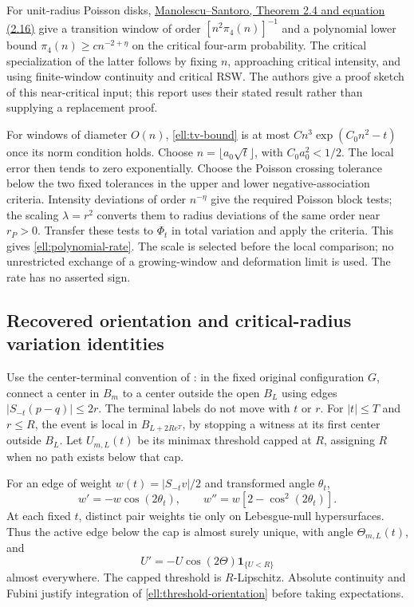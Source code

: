 \documentclass[11pt,a4paper]{article}
\theoremstyle{definition}
\theoremstyle{remark}
\numberwithin{equation}{section}
\begin{document}
For unit-radius Poisson disks,
\href{https://arxiv.org/html/2211.11661v1}{Manolescu--Santoro,
Theorem 2.4 and equation (2.16)} give a transition window of order
$[n^2\pi_4(n)]^{-1}$ and a polynomial lower bound
$\pi_4(n)\ge c n^{-2+\eta}$ on the critical four-arm probability.
The critical specialization of the latter follows by fixing $n$,
approaching critical intensity, and using finite-window continuity and
critical RSW. The authors give a proof sketch of this near-critical
input; this report uses their stated result rather than supplying a
replacement proof.

For windows of diameter $O(n)$, \eqref{ell:tv-bound} is at most
$Cn^3\exp(C_0n^2-t)$ once its norm condition holds. Choose
$n=\lfloor a_0\sqrt t\rfloor$, with $C_0a_0^2<1/2$.
The local error then tends to zero exponentially. Choose the Poisson
crossing tolerance below the two fixed tolerances in the upper and
lower negative-association criteria. Intensity deviations of order
$n^{-\eta}$ give the required Poisson block tests; the scaling
$\lambda=r^2$ converts them to radius deviations of the same order
near $r_P>0$. Transfer these tests to $\Phi_t$ in total variation and
apply the criteria. This gives \eqref{ell:polynomial-rate}.
The scale is selected before the local comparison; no unrestricted
exchange of a growing-window and deformation limit is used.
The rate has no asserted sign.

\subsection{Recovered orientation and critical-radius variation identities}
\label{ell:orientation}

Use the center-terminal convention of :
in the fixed original configuration $G$, connect a center in $B_m$ to
a center outside the open $B_L$ using edges
$|S_{-t}(p-q)|\le2r$. The terminal labels do not move with $t$ or $r$.
For $|t|\le T$ and $r\le R$, the event is local in $B_{L+2Re^T}$,
by stopping a witness at its first center outside $B_L$. Let
$U_{m,L}(t)$ be its minimax threshold capped at $R$, assigning $R$
when no path exists below that cap.

For an edge of weight $w(t)=|S_{-t}v|/2$ and transformed angle
$\theta_t$,
\[
 w'=-w\cos(2\theta_t),\qquad
 w''=w[2-\cos^2(2\theta_t)].
\]
At each fixed $t$, distinct pair weights tie only on Lebesgue-null
hypersurfaces. Thus the active edge below the cap is almost surely
unique, with angle $\Theta_{m,L}(t)$, and
\begin{equation}\label{ell:threshold-orientation}
 U'=-U\cos(2\Theta)\mathbf1_{\{U<R\}}
\end{equation}
almost everywhere. The capped threshold is $R$-Lipschitz.
Absolute continuity and Fubini justify integration of
\eqref{ell:threshold-orientation} before taking expectations.
\end{document}
